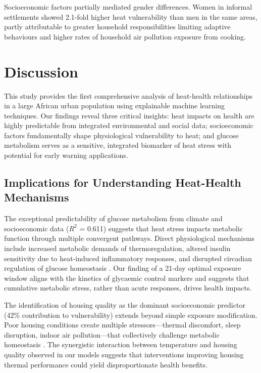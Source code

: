 \documentclass[11pt,a4paper]{article}
\begin{document}
Socioeconomic factors partially mediated gender differences. Women in informal settlements showed 2.1-fold higher heat vulnerability than men in the same areas, partly attributable to greater household responsibilities limiting adaptive behaviours and higher rates of household air pollution exposure from cooking.

\section{Discussion}

This study provides the first comprehensive analysis of heat-health relationships in a large African urban population using explainable machine learning techniques. Our findings reveal three critical insights: heat impacts on health are highly predictable from integrated environmental and social data; socioeconomic factors fundamentally shape physiological vulnerability to heat; and glucose metabolism serves as a sensitive, integrated biomarker of heat stress with potential for early warning applications.

\subsection{Implications for Understanding Heat-Health Mechanisms}

The exceptional predictability of glucose metabolism from climate and socioeconomic data ($R^2$ = 0.611) suggests that heat stress impacts metabolic function through multiple convergent pathways. Direct physiological mechanisms include increased metabolic demands of thermoregulation, altered insulin sensitivity due to heat-induced inflammatory responses, and disrupted circadian regulation of glucose homeostasis \citep{Kenny2018, Lim2018}. Our finding of a 21-day optimal exposure window aligns with the kinetics of glycaemic control markers and suggests that cumulative metabolic stress, rather than acute responses, drives health impacts.

The identification of housing quality as the dominant socioeconomic predictor (42\% contribution to vulnerability) extends beyond simple exposure modification. Poor housing conditions create multiple stressors—thermal discomfort, sleep disruption, indoor air pollution—that collectively challenge metabolic homeostasis \citep{Quinn2014, Tham2020}. The synergistic interaction between temperature and housing quality observed in our models suggests that interventions improving housing thermal performance could yield disproportionate health benefits.
\end{document}
